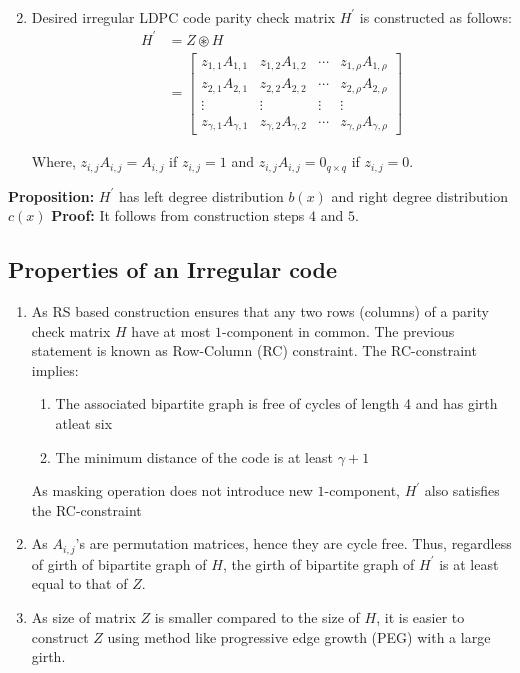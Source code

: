 \begin{enumerate}
\begin{align}
\end{align}
 \item Desired irregular LDPC code parity check matrix $H^\prime$ is constructed as follows\cite{geometry}:
\begin{align}
H^\prime&=Z \circledast H \nonumber\\
&=\begin{bmatrix}
z_{1,1}A_{1,1} & z_{1,2}A_{1,2} & \cdots & z_{1,\rho}A_{1,\rho}\\
z_{2,1}A_{2,1} & z_{2,2}A_{2,2} & \cdots & z_{2,\rho}A_{2,\rho}\\
\vdots & \vdots & \vdots & \vdots \\
z_{\gamma,1}A_{\gamma,1} & z_{\gamma,2}A_{\gamma,2} & \cdots & z_{\gamma,\rho}A_{\gamma,\rho} \end{bmatrix} \nonumber
\end{align}

Where, $z_{i,j}A_{i,j}=A_{i,j}$ if $z_{i,j}=1$ and $z_{i,j}A_{i,j}=0_{q \times q}$ if $z_{i,j}=0$.
\end{enumerate}
%
\textbf{Proposition:}
$H^\prime$ has left degree distribution $b(x)$ and right degree distribution $c(x)$
%
\textbf{Proof:}
It follows from construction steps $4$ and $5$.

\subsection{Properties of an Irregular code}
\begin{enumerate}
 \item As RS  based construction ensures that any two rows (columns) of a parity check matrix $H$ have at most $1$-component in common. The previous statement is known as Row-Column (RC) constraint. The RC-constraint implies:
\begin{enumerate}
\item The associated bipartite graph is free of cycles of length 4 and has girth atleat six
\item The minimum distance of  the code is at least $\gamma+1$
\end{enumerate}

As masking operation does not introduce new $1$-component, $H^\prime$ also satisfies the RC-constraint
 \item As $A_{i,j}$'s are permutation matrices, hence they are cycle free. Thus, regardless of girth of bipartite graph of $H$, the girth of bipartite graph of $H^\prime$ is at least equal to that of $Z$.
 \item As size of matrix $Z$ is smaller compared to the size of $H$, it is easier to construct $Z$ using method like progressive edge growth (PEG) with a large girth.
\end{enumerate}

